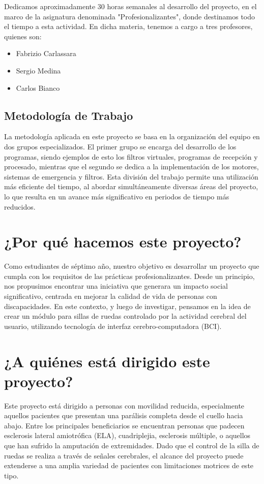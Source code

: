 \documentclass{article}
\begin{document}
Dedicamos aproximadamente 30 horas semanales al desarrollo del proyecto, en el marco de la asignatura denominada "Profesionalizantes", donde destinamos todo el tiempo a esta actividad. En dicha materia, tenemos a cargo a tres profesores, quienes son:

\begin{itemize}
    \item Fabrizio Carlassara
    \item Sergio Medina
    \item Carlos Bianco
\end{itemize}

\subsection{Metodología de Trabajo}

La metodología aplicada en este proyecto se basa en la organización del equipo en dos grupos especializados. El primer grupo se encarga del desarrollo de los programas, siendo ejemplos de esto los filtros virtuales, programas de recepción y procesado, mientras que el segundo se dedica a la implementación de los motores, sistemas de emergencia y filtros. Esta división del trabajo permite una utilización más eficiente del tiempo, al abordar simultáneamente diversas áreas del proyecto, lo que resulta en un avance más significativo en periodos de tiempo más reducidos.

\section{¿Por qué hacemos este proyecto?}

Como estudiantes de séptimo año, nuestro objetivo es desarrollar un proyecto que cumpla con los requisitos de las prácticas profesionalizantes. Desde un principio, nos propusimos encontrar una iniciativa que generara un impacto social significativo, centrada en mejorar la calidad de vida de personas con discapacidades. En este contexto, y luego de investigar, pensamos en la idea de crear un módulo para sillas de ruedas controlado por la actividad cerebral del usuario, utilizando tecnología de interfaz cerebro-computadora (BCI).

\section{¿A quiénes está dirigido este proyecto?}
Este proyecto está dirigido a personas con movilidad reducida, especialmente aquellos pacientes que presentan una parálisis completa desde el cuello hacia abajo. Entre los principales beneficiarios se encuentran personas que padecen esclerosis lateral amiotrófica (ELA), cuadriplejia, esclerosis múltiple, o aquellos que han sufrido la amputación de extremidades. Dado que el control de la silla de ruedas se realiza a través de señales cerebrales, el alcance del proyecto puede extenderse a una amplia variedad de pacientes con limitaciones motrices de este tipo.
\end{document}
